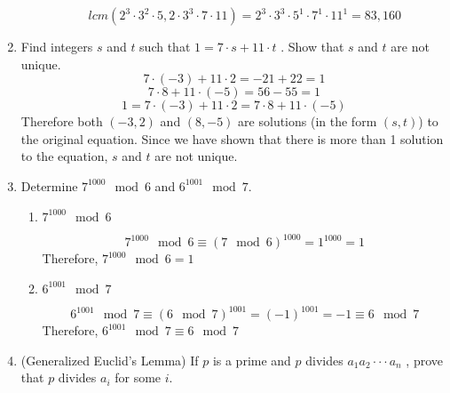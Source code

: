 \documentclass[12pt,letterpaper,reqno]{amsart}
\begin{document}
\begin{enumerate}
\begin{enumerate}
        $$lcm(2^3 \cdot 3^2 \cdot 5,2 \cdot 3^3 \cdot 7 \cdot 11) = 2^3 \cdot 3^3 \cdot 5^1 \cdot 7^1 \cdot 11^1 = 83{,}160$$
\end{enumerate}

\item Find integers $s$ and $t$ such that $1 = 7 \cdot s + 11 \cdot t$ . Show that $s$ and $t$ are not unique.
$$7 \cdot (-3) + 11 \cdot 2 = -21 + 22 = 1$$
$$7 \cdot 8 + 11 \cdot (-5) = 56 - 55 = 1$$
$$1 = 7 \cdot (-3) + 11 \cdot 2 = 7 \cdot 8 + 11 \cdot (-5)$$
Therefore both $(-3, 2)$ and $(8, -5)$ are solutions (in the form $(s,t)$) to the original equation. Since we have shown that there is more than 1 solution to the equation, $s$ and $t$ are not unique.
\newpage
\item Determine $7^{1000} \mod 6$ and $6^{1001} \mod 7$.
\begin{enumerate}
    \item $7^{1000} \mod 6$
    \begin{flushleft}
    $$7^{1000} \mod 6 \equiv (7 \mod 6)^{1000} = 1^{1000} = 1$$
    Therefore, $7^{1000} \mod 6 = 1$
    \end{flushleft}
    
    \item $6^{1001} \mod 7$
    \begin{flushleft}
    $$6^{1001} \mod 7 \equiv (6 \mod 7)^{1001} = (-1)^{1001} = -1 \equiv 6 \mod 7$$
    Therefore, $6^{1001} \mod 7 \equiv 6 \mod 7$
    \end{flushleft}
\end{enumerate}

\item (Generalized Euclid’s Lemma) If $p$ is a prime and $p$ divides $a_1 a_2 \cdot\cdot\cdot a_n$ , prove that $p$ divides $a_i$ for some $i$.


\end{enumerate}
\end{document}
